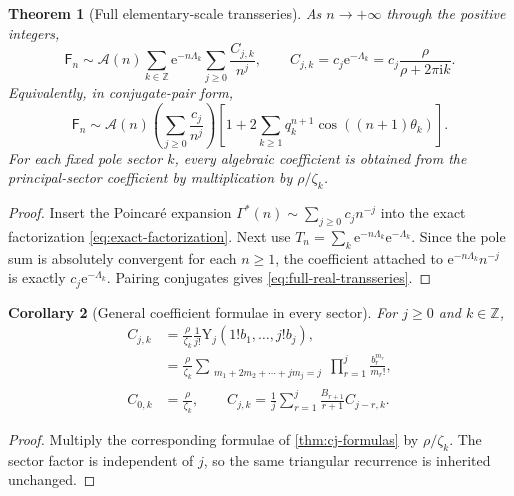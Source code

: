 \documentclass[11pt,a4paper,oneside]{article}
\newtheorem{theorem}{Theorem}[section]
\newtheorem{corollary}[theorem]{Corollary}
\theoremstyle{definition}
\theoremstyle{remark}
\newcommand{\Fub}{\mathsf{F}}
\newcommand{\e}{\mathrm{e}}
\newcommand{\ii}{\mathrm{i}}
\newcommand{\BellY}{\mathrm{Y}}
\newcommand{\GammaStar}{\Gamma^{\!*}}
\newcommand{\asympseries}{\mathrel{\sim}}
\begin{document}
\begin{theorem}[Full elementary-scale transseries]\label{thm:full-transseries}
As $n\to+\infty$ through the positive integers,
\begin{equation}\label{eq:full-transseries}
 \boxed{\displaystyle
 \Fub_n\asympseries
 \mathcal A(n)
 \sum_{k\in\mathbb Z}\e^{-n\Lambda_k}
 \sum_{j\ge0}\frac{C_{j,k}}{n^j},
 \qquad
 C_{j,k}=c_j\e^{-\Lambda_k}
        =c_j\frac{\rho}{\rho+2\pi\ii k}.}
\end{equation}
Equivalently, in conjugate-pair form,
\begin{equation}\label{eq:full-real-transseries}
 \Fub_n\asympseries
 \mathcal A(n)
 \left(\sum_{j\ge0}\frac{c_j}{n^j}\right)
 \left[1+2\sum_{k\ge1}q_k^{n+1}
             \cos((n+1)\theta_k)\right].
\end{equation}
For each fixed pole sector $k$, every algebraic coefficient is obtained from
the principal-sector coefficient by multiplication by $\rho/\zeta_k$.
\end{theorem}

\begin{proof}
Insert the Poincar\'e expansion
$\GammaStar(n)\sim\sum_{j\ge0}c_jn^{-j}$ into the exact factorization
\cref{eq:exact-factorization}.  Next use
$T_n=\sum_k\e^{-n\Lambda_k}\e^{-\Lambda_k}$.  Since the pole sum is
absolutely convergent for each $n\ge1$, the coefficient attached to
$\e^{-n\Lambda_k}n^{-j}$ is exactly
$c_j\e^{-\Lambda_k}$.  Pairing conjugates gives
\cref{eq:full-real-transseries}.
\end{proof}

\begin{corollary}[General coefficient formulae in every sector]
\label{cor:Cjk}
For $j\ge0$ and $k\in\mathbb Z$,
\begin{align}
 C_{j,k}
 &=\frac{\rho}{\zeta_k}\frac1{j!}
   \BellY_j(1!b_1,\ldots,j!b_j),\label{eq:C-bell}\\
 &=\frac{\rho}{\zeta_k}
   \sum_{\substack{m_1+2m_2+\cdots+jm_j=j}}
   \prod_{r=1}^{j}\frac{b_r^{m_r}}{m_r!},
 \label{eq:C-partition}\\
 C_{0,k}&=\frac{\rho}{\zeta_k},\qquad
 C_{j,k}=\frac1j\sum_{r=1}^{j}
       \frac{B_{r+1}}{r+1}C_{j-r,k}.
 \label{eq:C-recurrence}
\end{align}
\end{corollary}

\begin{proof}
Multiply the corresponding formulae of \cref{thm:cj-formulas} by
$\rho/\zeta_k$.  The sector factor is independent of $j$, so the same
triangular recurrence is inherited unchanged.
\end{proof}
\end{document}
